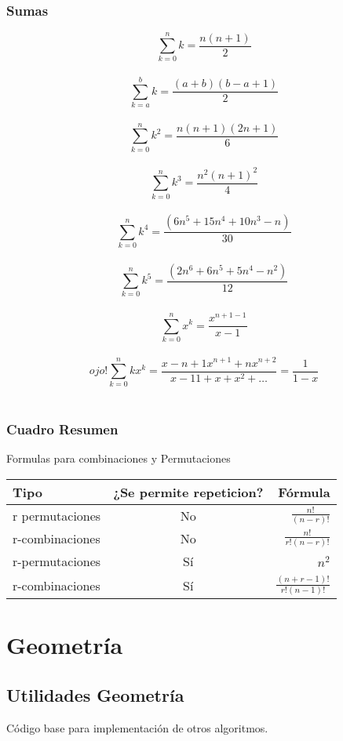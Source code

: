 \documentclass[10pt,letterpaper,twocolumn,twosided]{article}
\newcommand{\codigofuente}[1]{

\dotfill
}
\begin{document}
\subsubsection{Sumas}


$$\sum_{k=0}^{n} k = \frac{n(n + 1)}{2}  $$\\ $$ \sum_{k=a}^{b} k = \frac{(a + b)(b - a + 1)}{2} $$ \\
$$ \sum_{k=0}^{n} k^2 = \frac{n(n + 1)(2n + 1)}{6} $$ \\ $$ \sum_{k=0}^{n} k^3 = \frac{n^{2}(n + 1)^{2}}{4} $$ \\
$$ \sum_{k=0}^{n} k^4 = \frac{(6n^5 + 15n^4 + 10n^3 - n)}{30} $$ \\ $$ \sum_{k=0}^{n} k^5 = \frac{(2n^6 + 6n^5 + 5n^4  - n^2)}{12} $$ \\
$$ \sum_{k=0}^{n} x^k = \frac{x^{n+1 - 1}}{x - 1} $$ \\

$$ojo ! \sum_{k=0}^{n} kx^k = \frac{{x - {n + 1}x^{n+1} + nx^{n+2}}}{{x - 1} 1 + x + x^2 + \dots }= \frac{1}{{1 - x}} $$ \\


\subsubsection{Cuadro Resumen}
Formulas para combinaciones y Permutaciones

\begin{tabular}[t]{|l |c |r|}
\hline
Tipo & ¿Se permite repeticion? & Fórmula \\
\hline
r permutaciones & No & $ {\frac{n!}{(n-r)!}} $ \\
\hline
r-combinaciones & No & $ {\frac{n!}{r!(n-r)!}} $  \\
\hline
r-permutaciones & Sí & $ {n^2} $ \\
\hline
r-combinaciones & Sí & ${\frac{(n+r-1)!}{r!(n-1)!}} $ \\
\hline
\end{tabular}

\section{Geometría}

\subsection{Utilidades Geometría}
Código base para implementación de otros algoritmos.
\codigofuente{src/geom/utilities.cpp}
\end{document}
